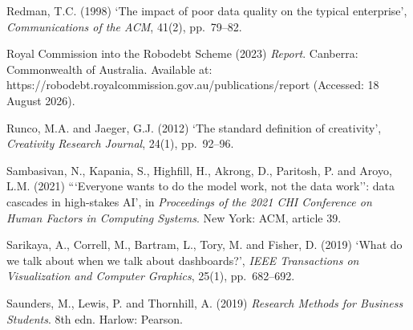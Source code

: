 \documentclass[11pt,a4paper]{article}
\numberwithin{figure}{section}
\numberwithin{table}{section}
\begin{document}
{\noindent\hypertarget{ref55}{}\begin{minipage}[t]{\dimexpr\linewidth-1.05cm\relax}Redman, T.C. (1998) `The impact of poor data quality on the typical enterprise', \emph{Communications of the ACM}, 41(2), pp.~79--82.\end{minipage}\par\vspace{4pt}
\noindent\hypertarget{ref56}{}\begin{minipage}[t]{\dimexpr\linewidth-1.05cm\relax}Royal Commission into the Robodebt Scheme (2023) \emph{Report}. Canberra: Commonwealth of Australia. Available at: https://robodebt.royalcommission.gov.au/publications/report (Accessed: 18 August 2026).\end{minipage}\par\vspace{4pt}
\noindent\hypertarget{ref57}{}\begin{minipage}[t]{\dimexpr\linewidth-1.05cm\relax}Runco, M.A. and Jaeger, G.J. (2012) `The standard definition of creativity', \emph{Creativity Research Journal}, 24(1), pp.~92--96.\end{minipage}\par\vspace{4pt}
\noindent\hypertarget{ref58}{}\begin{minipage}[t]{\dimexpr\linewidth-1.05cm\relax}Sambasivan, N., Kapania, S., Highfill, H., Akrong, D., Paritosh, P. and Aroyo, L.M. (2021) ```Everyone wants to do the model work, not the data work'': data cascades in high-stakes AI', in \emph{Proceedings of the 2021 CHI Conference on Human Factors in Computing Systems}. New York: ACM, article 39.\end{minipage}\par\vspace{4pt}
\noindent\hypertarget{ref59}{}\begin{minipage}[t]{\dimexpr\linewidth-1.05cm\relax}Sarikaya, A., Correll, M., Bartram, L., Tory, M. and Fisher, D. (2019) `What do we talk about when we talk about dashboards?', \emph{IEEE Transactions on Visualization and Computer Graphics}, 25(1), pp.~682--692.\end{minipage}\par\vspace{4pt}
\noindent\hypertarget{ref60}{}\begin{minipage}[t]{\dimexpr\linewidth-1.05cm\relax}Saunders, M., Lewis, P. and Thornhill, A. (2019) \emph{Research Methods for Business Students}. 8th edn. Harlow: Pearson.\end{minipage}\par\vspace{4pt}
}
\end{document}
